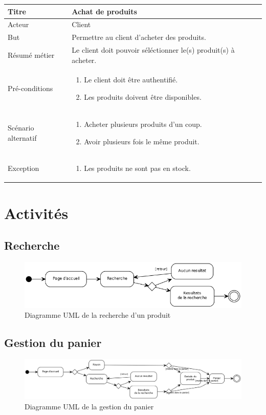 \documentclass[12pt]{article}
\newcommand\addrow[2]{#1 &#2\\ }
\newcommand\addheading[2]{\textbf{#1} &#2\\ \hline}
\newcommand\tabularhead{\begin{tabular}{lp{11cm}}
\hline
}
\newcommand\addmulrow[2]{ \begin{minipage}[t][][t]{3.5cm}#1\end{minipage}%
    &\begin{minipage}[t][][t]{11cm}
    \begin{enumerate} #2   \end{enumerate}
    \end{minipage}\\ }
\newenvironment{usecase}{\tabularhead}
{\hline\end{tabular}}
\begin{document}
\begin{usecase}
    \addheading{Titre}{Achat de produits}
    \addrow{Acteur}{Client}
    \addrow{But}{Permettre au client d'acheter des produits.}
    \addrow{Résumé métier}{Le client doit pouvoir séléctionner le(s) produit(s) à acheter.}
    \addmulrow{Pré-conditions}{
    \item Le client doit être authentifié.
    \item Les produits doivent être disponibles.
    }
    \addmulrow{Scénario alternatif}{
    \item Acheter plusieurs produits d'un coup.
    \item Avoir plusieurs fois le même produit.
    }
    \addmulrow{Exception}{
    \item Les produits ne sont pas en stock.
    }
\end{usecase}

\newpage
\section{Activités}

\subsection{Recherche}

\begin{figure}[ht]
    \center
    \includegraphics[scale=0.6]{../Diagrams/ActivityDiagrams/recherche.png}
    \caption*{Diagramme UML de la recherche d'un produit}
\end{figure}

\subsection{Gestion du panier}

\begin{figure}[ht]
    \center
    \includegraphics[scale=0.4]{../Diagrams/ActivityDiagrams/panier.png}
    \caption*{Diagramme UML de la gestion du panier}
\end{figure}
\end{document}
